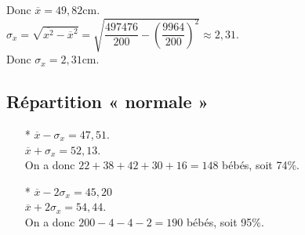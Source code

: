 Donc $\overline{x} = 49,82$cm. \\

$\sigma_x = \sqrt{\overline{x^2} - \overline{x}^2} = \sqrt{\dfrac{497476}{200} - \left(\dfrac{9964}{200}\right)^2} \approx 2,31$. \\

Donc $\sigma_x = 2,31$cm. \\

\subsection{Répartition « normale »}

\begin{itemize}
\item[*] $\overline{x} - \sigma_x = 47,51$. \\ $\overline{x} + \sigma_x = 52,13$. \\On a donc $22 + 38 + 42 + 30 + 16 = 148$ bébés, soit 74\%. 
\\
\item[*] $\overline{x} - 2\sigma_x = 45,20$ \\ $\overline{x} + 2\sigma_x = 54,44$. \\ On a donc $200 - 4 - 4 - 2 = 190$ bébés, soit 95\%. 
\end{itemize}

\ifdefined\COMPLETE
\else
    
\fi